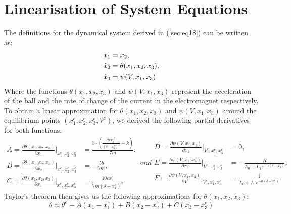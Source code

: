 \documentclass[a4paper,10pt,reqno]{amsart}
\numberwithin{equation}{section}
\begin{document}
\section{Linearisation of System Equations}
The definitions for the dynamical system derived in (\ref{sec:eq18}) can be written as:
\begin{align}
\notag \dot x_1 &= x_2,                  \\
\notag \dot x_2 &= \theta(x_1, x_2, x_3),  \\
\notag \dot x_3 &= \psi(V, x_1, x_3)
\end{align}
Where the functions $\theta(x_1, x_2, x_3)$ and $\psi(V, x_1, x_3)$ represent the acceleration of the ball and the rate of change of the current in the electromagnet respectively.
To obtain a linear approximation for $\theta(x_1, x_2, x_3)$ and $\psi(V, x_1, x_3)$ around the equilibrium points $(x_1^e, x_2^e, x_3^e, V^e)$, we derived the following partial derivatives for both functions:
\begin{subequations}
\label{sec:eq21}
\begin{align}
    A = \frac{\partial \theta(x_1,x_2,x_3)}{\partial x_1}\bigg|_{x_1^e, x_2^e, x_3^e} &= \frac{5 \cdot \left(\frac{2 c {x_{3}^e}^{2}}{\left(\delta - x_{1}^e\right)^{3}} - k\right)}{7 m}, \\
    B = \frac{\partial \theta(x_1,x_2,x_3)}{\partial x_2}\bigg|_{x_1^e, x_2^e, x_3^e} &= - \frac{5 b}{7 m}, \\
    C = \frac{\partial \theta(x_1,x_2,x_3)}{\partial x_3}\bigg|_{x_1^e, x_2^e, x_3^e} &= \frac{10 c x_3^e}{7 m \left(\delta - x_1^e\right)^{2}}
\end{align}
and
\begin{align}
    D = \frac{\partial \psi(V,x_1,x_3)}{\partial x_1}\bigg|_{V^e, x_1^e, x_3^e} &= 0, \\
    E = \frac{\partial \psi(V,x_1,x_3)}{\partial x_3}\bigg|_{V^e, x_1^e, x_3^e} &=- \frac{R}{L_{0} + L_{1} e^{- \alpha \left(\delta - x_{1}^e\right)}}, \\
    F = \frac{\partial \psi(V,x_1,x_3)}{\partial V}\bigg|_{V^e, x_1^e, x_3^e} &=\frac{1}{L_{0} + L_{1} e^{- \alpha \left(\delta - x_{1}^e\right)}}
\end{align}
\end{subequations}
Taylor's theorem then gives us the following approximations for $\theta(x_1, x_2, x_3)$:
\begin{equation}
\label{sec:eq22}
    \theta \approx \theta^{e} + A(x_1-x_1^e) + B(x_2-x_2^e) + C(x_3-x_3^e)
\end{equation}
\end{document}
